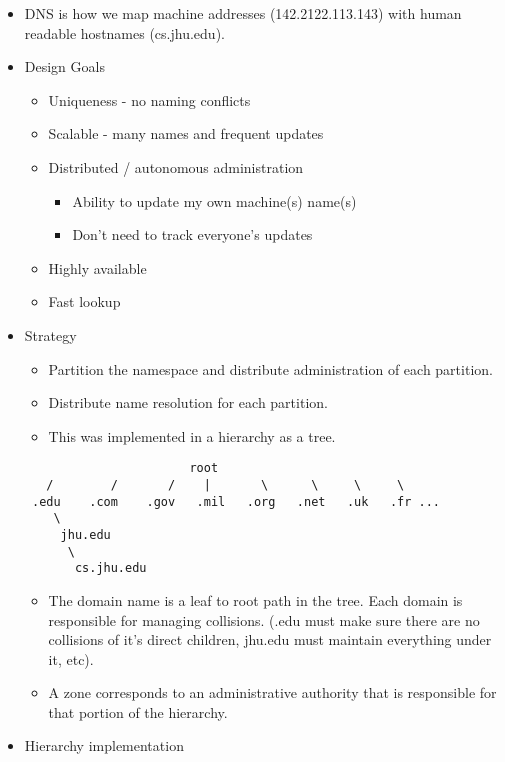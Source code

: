 \begin{itemize}
\tightlist
\item
  DNS is how we map machine addresses (142.2122.113.143) with human
  readable hostnames (cs.jhu.edu).
\item
  Design Goals

  \begin{itemize}
  \tightlist
  \item
    Uniqueness - no naming conflicts
  \item
    Scalable - many names and frequent updates
  \item
    Distributed / autonomous administration

    \begin{itemize}
    \tightlist
    \item
      Ability to update my own machine(s) name(s)
    \item
      Don't need to track everyone's updates
    \end{itemize}
  \item
    Highly available
  \item
    Fast lookup
  \end{itemize}
\item
  Strategy

  \begin{itemize}
  \tightlist
  \item
    Partition the namespace and distribute administration of each
    partition.
  \item
    Distribute name resolution for each partition.
  \item
    This was implemented in a hierarchy as a tree.
  \end{itemize}

\begin{verbatim}
                       root
   /        /       /    |       \      \     \     \
 .edu    .com    .gov   .mil   .org   .net   .uk   .fr ...
    \
     jhu.edu 
      \
       cs.jhu.edu
\end{verbatim}

  \begin{itemize}
  \tightlist
  \item
    The domain name is a leaf to root path in the tree. Each domain is
    responsible for managing collisions. (.edu must make sure there are
    no collisions of it's direct children, jhu.edu must maintain
    everything under it, etc).
  \item
    A zone corresponds to an administrative authority that is
    responsible for that portion of the hierarchy.
  \end{itemize}
\item
  Hierarchy implementation


\end{itemize}
